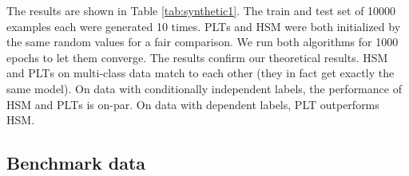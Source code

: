 \documentclass{article}
\newcommand{\Algo}[1]{\textsc{#1}}
\begin{document}
{The results are shown in Table \ref{tab:synthetic1}. The train and test set of 10000 examples each were generated 10 times. \Algo{PLT}s and \Algo{HSM} were both initialized by the same random values for a fair comparison. We run both algorithms for 1000 epochs to let them converge. 
The results confirm our theoretical results. \Algo{HSM} and \Algo{PLT}s on multi-class data match to each other (they in fact get exactly the same model). On data with conditionally independent labels, the performance of \Algo{HSM} and \Algo{PLT}s is on-par. %
On data with dependent labels, \Algo{PLT} outperforms \Algo{HSM}. 


\subsection{Benchmark data}

}
\end{document}
